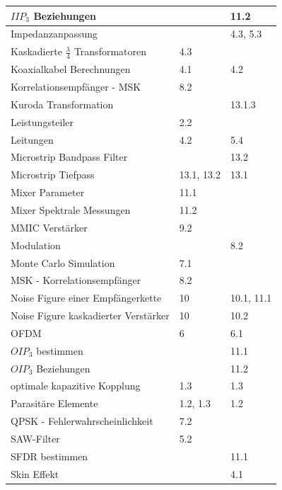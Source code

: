 \begin{tabular}{|l|l|l|}
\hline
$IIP_3$ Beziehungen  &            &       11.2 \\
\hline
Impedanzanpassung &            &   4.3, 5.3 \\
\hline
Kaskadierte $\frac{\lambda}{4}$ Transformatoren &        4.3 &            \\
\hline
Koaxialkabel Berechnungen &        4.1 &        4.2 \\
\hline
Korrelationsempfänger - MSK &        8.2 &            \\
\hline
Kuroda Transformation &            &     13.1.3 \\
\hline
Leistungsteiler &        2.2 &            \\
\hline
Leitungen  &        4.2 &        5.4 \\
\hline
Microstrip Bandpass Filter &            &       13.2 \\
\hline
Microstrip Tiefpass & 13.1, 13.2 &       13.1 \\
\hline
Mixer Parameter &       11.1 &            \\
\hline
Mixer Spektrale Messungen &       11.2 &            \\
\hline
MMIC Verstärker &        9.2 &            \\
\hline
Modulation &            &        8.2 \\
\hline
Monte Carlo Simulation &        7.1 &            \\
\hline
MSK - Korrelationsempfänger &        8.2 &            \\
\hline
Noise Figure einer Empfängerkette &         10 & 10.1, 11.1 \\
\hline
Noise Figure kaskadierter Verstärker &         10 &       10.2 \\
\hline
      OFDM &          6 &        6.1 \\
\hline
$OIP_3$ bestimmen &            &       11.1 \\
\hline
$OIP_3$ Beziehungen &            &       11.2 \\
\hline
optimale kapazitive Kopplung &        1.3 &        1.3 \\
\hline
Parasitäre Elemente &   1.2, 1.3 &        1.2 \\
\hline
QPSK - Fehlerwahrscheinlichkeit &        7.2 &            \\
\hline
SAW-Filter &        5.2 &            \\
\hline
SFDR bestimmen &            &       11.1 \\
\hline
Skin Effekt &            &        4.1 \\

\end{tabular}
